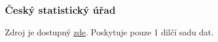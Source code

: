\documentclass[12pt]{article}
\begin{document}








\subsubsection{Český statistický úřad}
\label{data3}
Zdroj je dostupný \href{https://www.czso.cz/csu/czso/obyvatelstvo-podle-petiletych-vekovych-skupin-a-pohlavi-v-krajich-a-okresech}{zde}. Poskytuje pouze 1 dilčí sadu dat.

\newpage
\end{document}
